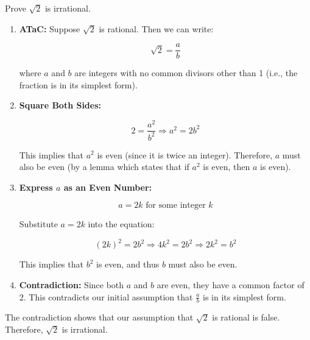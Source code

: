     \begin{example}
        Prove $\sqrt{2}$ is irrational.
        \begin{enumerate}
            \item \textbf{ATaC:} Suppose \(\sqrt{2}\) is rational. Then we can write:
            
            \[
            \sqrt{2} = \frac{a}{b}
            \]
            
            where \( a \) and \( b \) are integers with no common divisors other than 1 (i.e., the fraction is in its simplest form).
            \vspace{1em}
            \item \textbf{Square Both Sides:}
            
            \[
            2 = \frac{a^2}{b^2}
            \Rightarrow a^2 = 2b^2
            \]
            
            This implies that \( a^2 \) is even (since it is twice an integer). Therefore, \( a \) must also be even (by a lemma which states that if \( a^2 \) is even, then \( a \) is even).
            \vspace{1em}

            \item \textbf{Express \( a \) as an Even Number:}
            
            \[
            a = 2k \text{ for some integer } k
            \]
            
            Substitute \( a = 2k \) into the equation:
            
            \[
            (2k)^2 = 2b^2 \Rightarrow 4k^2 = 2b^2 \Rightarrow 2k^2 = b^2
            \]
            
            This implies that \( b^2 \) is even, and thus \( b \) must also be even.
            \vspace{1em}
            \item \textbf{Contradiction:} Since both \( a \) and \( b \) are even, they have a common factor of 2. This contradicts our initial assumption that \( \frac{a}{b} \) is in its simplest form.
            \vspace{1em}
        
        \end{enumerate}
        The contradiction shows that our assumption that \(\sqrt{2}\) is rational is false. Therefore, \(\sqrt{2}\) is irrational.
    \end{example}

